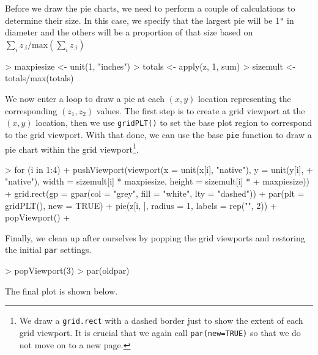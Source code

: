\documentclass[a4paper]{article}
\begin{document}
\begin{Schunk}
\end{Schunk}
Before we draw the pie charts, we need to perform a couple of
calculations to determine their size.  In this case, we specify that
the largest pie will be 1\verb|"| in diameter and the others will be 
a proportion of that size based on $\sum_i{z_{.i}} /
{}\left( \sum_i{z_{.i}} \right)$

\begin{Schunk}
\begin{Sinput}
> maxpiesize <- unit(1, "inches")
> totals <- apply(z, 1, sum)
> sizemult <- totals/max(totals)
\end{Sinput}
\end{Schunk}
We now enter a loop to draw a pie at each $(x, y)$ location
representing the corresponding $(z_1, z_2)$ values.  The first
step is to create a grid viewport at the $(x, y)$ location,
then we use \verb|gridPLT()|
to set the base plot region to correspond to the grid viewport.
With that done, we can use the base \verb|pie| function to draw a pie
chart within the grid viewport\footnote{We draw a {\tt grid.rect} 
with a dashed border just to show the extent of each grid viewport.
It is crucial that we again call {\tt par(new=TRUE)} so that
we do not move on to a new page.}.  

\begin{Schunk}
\begin{Sinput}
> for (i in 1:4) {
+     pushViewport(viewport(x = unit(x[i], "native"), y = unit(y[i], 
+         "native"), width = sizemult[i] * maxpiesize, height = sizemult[i] * 
+         maxpiesize))
+     grid.rect(gp = gpar(col = "grey", fill = "white", lty = "dashed"))
+     par(plt = gridPLT(), new = TRUE)
+     pie(z[i, ], radius = 1, labels = rep("", 2))
+     popViewport()
+ }
\end{Sinput}
\end{Schunk}
Finally, we clean up after ourselves by popping the grid viewports
and restoring the initial \verb|par| settings.

\begin{Schunk}
\begin{Sinput}
> popViewport(3)
> par(oldpar)
\end{Sinput}
\end{Schunk}
The final plot is shown below.
\end{document}
